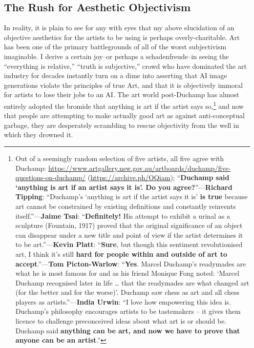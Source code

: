 \documentclass[11pt]{article}
\begin{document}
\subsection*{The Rush for Aesthetic Objectivism}
\label{sec:org0fffb36}
In reality, it is plain to see for any with eyes that my above elucidation of an objective aesthetics for the artists to be using is perhaps overly-charitable. Art has been one of the primary battlegrounds of all of the worst subjectivism imaginable. I derive a certain joy--or perhaps a schadenfreude--in seeing the ``everything is relative,'' ``truth is subjective,'' crowd who have dominated the art industry for decades instantly turn on a dime into asserting that AI image generations violate the principles of true Art, and that it is objectively immoral for artists to lose their jobs to an AI. The art world post-Duchamp has almost entirely adopted the bromide that anything is art if the artist says so,\footnote{Out of a seemingly random selection of five artists, all five agree with Duchamp: \url{https://www.artgallery.nsw.gov.au/artboards/duchamp/five-questions-on-duchamp/} (\url{https://archive.ph/OQiam}); ``\textbf{Duchamp said ‘anything is art if an artist says it is’. Do you agree?}''---\textbf{Richard Tipping}: ``Duchamp’s `anything is art if the artist says it is' \textbf{is true} because art cannot be constrained by existing definitions and constantly reinvents itself.''---\textbf{Jaime Tsai}: ``\textbf{Definitely!} His attempt to exhibit a urinal as a sculpture (Fountain, 1917) proved that the original significance of an object can disappear under a new title and point of view if the artist determines it to be art.''---\textbf{Kevin Platt}: ``\textbf{Sure}, but though this sentiment revolutionised art, I think it’s still \textbf{hard for people within and outside of art to accept}.''---\textbf{Tom Picton-Warlow}: ``\textbf{Yes}. Marcel Duchamp’s readymades are what he is most famous for and as his friend Monique Fong noted: `Marcel Duchamp recognised later in life … that the readymades are what changed art (for the better and for the worse)'. Duchamp saw chess as art and all chess players as artists.''---\textbf{India Urwin}: ``I love how empowering this idea is. Duchamp’s philosophy encourages artists to be tastemakers – it gives them licence to challenge preconceived ideas about what art is or should be. Duchamp said \textbf{anything can be art, and now we have to prove that anyone can be an artist}.''} and now that people are attempting to make actually good art as against anti-conceptual garbage, they are desperately scrambling to rescue objectivity from the well in which they drowned it.
\end{document}
